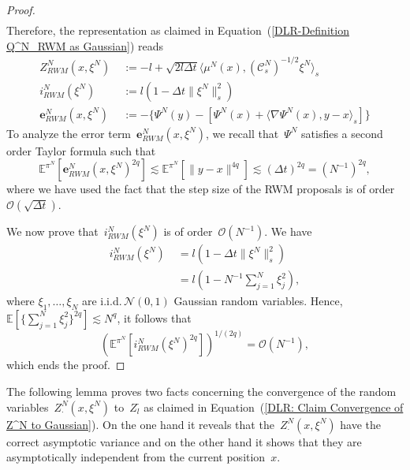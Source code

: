\begin{proof}
\begin{align*}
\end{align*}
Therefore, the representation as claimed in Equation~(\ref{DLR-Definition Q^N_RWM as Gaussian}) reads
\begin{align}
 Z^N_{RWM} (x, \xi^N) & \; := - l + \sqrt{2l \Delta t} \langle  \mu^N(x) , (\mathcal{C}^N_s)^{-1/2} \xi^N \rangle_s \\
 i^N_{RWM}( \xi^N) & \; := l (1 -  \Delta t \| \xi^N\|_{s}^2) \\
 \textbf{e}^N_{RWM}(x, \xi^N) & \; := - \{  \Psi^N(y) - [ \Psi^N(x) + \langle \nabla \Psi^N(x), y - x\rangle_s ]\}
\end{align}
To analyze the error term~$\textbf{e}^N_{RWM}(x, \xi^N)$, we recall that~$\Psi^N$ satisfies a second order Taylor formula such that
\begin{equation*}
  \mathbb{E}^{\pi^N}[\textbf{e}^N_{RWM}(x, \xi^N)^{2q}] \lesssim \mathbb{E}^{\pi^N}[\| y-x \|^{4q}] \lesssim (\Delta t)^{2q} = (N^{-1})^{2q},
\end{equation*}
where we have used the fact that the step size of the RWM proposals is of order~$\mathcal{O}(\sqrt{\Delta t})$.

We now prove that~$i^N_{RWM}( \xi^N)$ is of order~$\mathcal{O}(N^{-1})$. We have
\begin{equation*}
  \begin{split}
   i^N_{RWM}( \xi^N) & \; = l (1 -  \Delta t \| \xi^N\|_{s}^2) \\
   & \; = l( 1 -  N^{-1} \sum_{j = 1}^{N} \xi_j^2 ),
  \end{split}
\end{equation*}
where $ \xi_1, \dots , \xi_N $ are i.i.d.\,$\mathcal{N}(0,1)$ Gaussian random variables. Hence, $ \mathbb{E}[\{ \sum_{j = 1}^{N} \xi_j^2  \}^{2q}] \lesssim N^q$, it follows that
\begin{equation*}
  \left( \mathbb{E}^{\pi^N}[ i^N_{RWM}( \xi^N)^{2q} ] \right)^{1/(2q)} = \mathcal{O}(N^{-1}),
\end{equation*}
which ends the proof.
  
\end{proof}


The following lemma proves two facts concerning the convergence of the random variables~$ Z^N_{\cdot} (x, \xi^N) $ to~$Z_l^{\cdot}$ as claimed in Equation~(\ref{DLR: Claim Convergence of Z^N to Gaussian}). On the one hand it reveals that the~$Z^N_{\cdot} (x, \xi^N)$ have the correct asymptotic variance and  on the other hand it shows that they are asymptotically independent from the current position~$x$.
      
